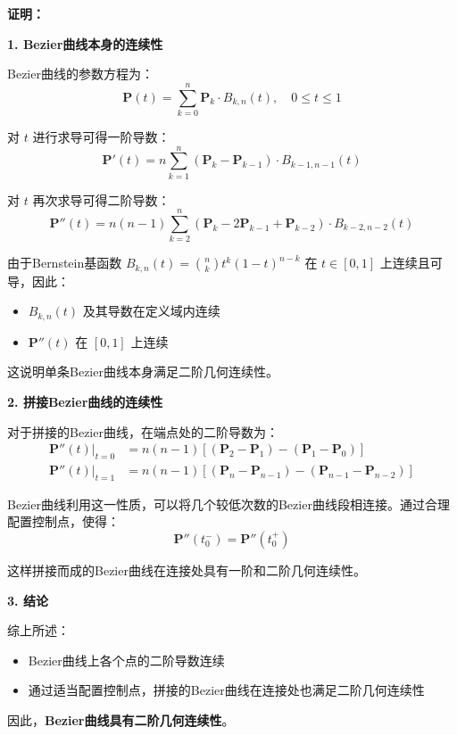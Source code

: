 \documentclass[12pt,a4paper]{article}
\begin{document}
\begin{tcolorbox}[breakable]
\textbf{证明：}

\textbf{1. Bezier曲线本身的连续性}

Bezier曲线的参数方程为：
\begin{equation}
\mathbf{P}(t) = \sum_{k=0}^{n} \mathbf{P}_k \cdot B_{k,n}(t), \quad 0 \leq t \leq 1
\end{equation}

对 $t$ 进行求导可得一阶导数：
\begin{equation}
\mathbf{P}'(t) = n \sum_{k=1}^{n} (\mathbf{P}_k - \mathbf{P}_{k-1}) \cdot B_{k-1,n-1}(t)
\end{equation}

对 $t$ 再次求导可得二阶导数：
\begin{equation}
\mathbf{P}''(t) = n(n-1) \sum_{k=2}^{n} (\mathbf{P}_k - 2\mathbf{P}_{k-1} + \mathbf{P}_{k-2}) \cdot B_{k-2,n-2}(t)
\end{equation}

由于Bernstein基函数 $B_{k,n}(t) = \binom{n}{k} t^k (1-t)^{n-k}$ 在 $t \in [0,1]$ 上连续且可导，因此：
\begin{itemize}
\item $B_{k,n}(t)$ 及其导数在定义域内连续
\item $\mathbf{P}''(t)$ 在 $[0,1]$ 上连续
\end{itemize}

这说明单条Bezier曲线本身满足二阶几何连续性。

\textbf{2. 拼接Bezier曲线的连续性}

对于拼接的Bezier曲线，在端点处的二阶导数为：
\begin{align}
\mathbf{P}''(t)\big|_{t=0} &= n(n-1)[(\mathbf{P}_2 - \mathbf{P}_1) - (\mathbf{P}_1 - \mathbf{P}_0)] \\
\mathbf{P}''(t)\big|_{t=1} &= n(n-1)[(\mathbf{P}_n - \mathbf{P}_{n-1}) - (\mathbf{P}_{n-1} - \mathbf{P}_{n-2})]
\end{align}

Bezier曲线利用这一性质，可以将几个较低次数的Bezier曲线段相连接。通过合理配置控制点，使得：
\begin{equation}
\mathbf{P}''(t_0^-) = \mathbf{P}''(t_0^+)
\end{equation}

这样拼接而成的Bezier曲线在连接处具有一阶和二阶几何连续性。

\textbf{3. 结论}

综上所述：
\begin{itemize}
\item Bezier曲线上各个点的二阶导数连续
\item 通过适当配置控制点，拼接的Bezier曲线在连接处也满足二阶几何连续性
\end{itemize}

因此，\textbf{Bezier曲线具有二阶几何连续性}。
\end{tcolorbox}
\end{document}

